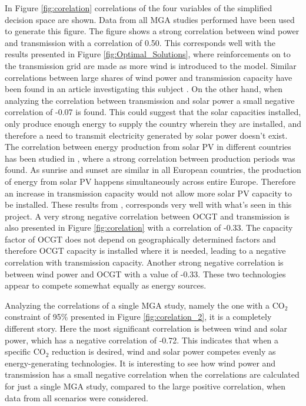 In Figure \ref{fig:corelation} correlations of the four variables of the simplified decision space are shown. Data from all MGA studies performed have been used to generate this figure. 
The figure shows a strong correlation between wind power and transmission with a correlation of 0.50. This corresponds well with the results presented in Figure \ref{fig:Optimal_Solutions}, where reinforcements on to the transmission grid are made as more wind is introduced to the model. Similar correlations between large shares of wind power and transmission capacity have been found in an article investigating this subject \cite{PURVINS20111461}. On the other hand, when analyzing the correlation between transmission and solar power a small negative correlation of -0.07 is found. This could suggest that the solar capacities installed, only produce enough energy to supply the country wherein they are installed, and therefore a need to transmit electricity generated by solar power doesn't exist. The correlation between energy production from solar PV in different countries has been studied in \cite{SolarPV_transmission}, where a strong correlation between production periods was found. As sunrise and sunset are similar in all European countries, the production of energy from solar PV happens simultaneously across entire Europe. Therefore an increase in transmission capacity would not allow more solar PV capacity to be installed. These results from \cite{SolarPV_transmission}, corresponds very well with what's seen in this project. 
A very strong negative correlation between OCGT and transmission is also presented in Figure \ref{fig:corelation} with a correlation of -0.33. The capacity factor of OCGT does not depend on geographically determined factors and therefore OCGT capacity is installed where it is needed, leading to a negative correlation with transmission capacity.  
Another strong negative correlation is between wind power and OCGT with a value of -0.33. These two technologies appear to compete somewhat equally as energy sources.  


Analyzing the correlations of a single MGA study, namely the one with a $\text{CO}_2$ constraint of 95\% presented in Figure \ref{fig:corelation_2}, it is a completely different story. Here the most significant correlation is between wind and solar power, which has a negative correlation of -0.72. This indicates that when a specific $\text{CO}_2$ reduction is desired, wind and solar power competes evenly as energy-generating technologies. 
It is interesting to see how wind power and transmission has a small negative correlation when the correlations are calculated for just a single MGA study, compared to the large positive correlation, when data from all scenarios were considered. 


